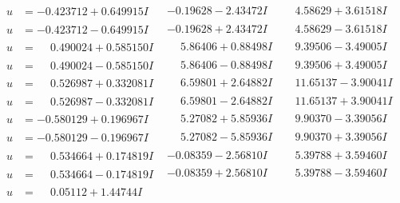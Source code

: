 \documentclass[1p]{elsarticle_modified}
\theoremstyle{definition}
\begin{document}
$$\begin{array}{c|c|c}
\begin{aligned}
u &= -0.423712 + 0.649915 I\end{aligned}
 & -0.19628 - 2.43472 I & \phantom{-}4.58629 + 3.61518 I \\ \hline\begin{aligned}
u &= -0.423712 - 0.649915 I\end{aligned}
 & -0.19628 + 2.43472 I & \phantom{-}4.58629 - 3.61518 I \\ \hline\begin{aligned}
u &= \phantom{-}0.490024 + 0.585150 I\end{aligned}
 & \phantom{-}5.86406 + 0.88498 I & \phantom{-}9.39506 - 3.49005 I \\ \hline\begin{aligned}
u &= \phantom{-}0.490024 - 0.585150 I\end{aligned}
 & \phantom{-}5.86406 - 0.88498 I & \phantom{-}9.39506 + 3.49005 I \\ \hline\begin{aligned}
u &= \phantom{-}0.526987 + 0.332081 I\end{aligned}
 & \phantom{-}6.59801 + 2.64882 I & \phantom{-}11.65137 - 3.90041 I \\ \hline\begin{aligned}
u &= \phantom{-}0.526987 - 0.332081 I\end{aligned}
 & \phantom{-}6.59801 - 2.64882 I & \phantom{-}11.65137 + 3.90041 I \\ \hline\begin{aligned}
u &= -0.580129 + 0.196967 I\end{aligned}
 & \phantom{-}5.27082 + 5.85936 I & \phantom{-}9.90370 - 3.39056 I \\ \hline\begin{aligned}
u &= -0.580129 - 0.196967 I\end{aligned}
 & \phantom{-}5.27082 - 5.85936 I & \phantom{-}9.90370 + 3.39056 I \\ \hline\begin{aligned}
u &= \phantom{-}0.534664 + 0.174819 I\end{aligned}
 & -0.08359 - 2.56810 I & \phantom{-}5.39788 + 3.59460 I \\ \hline\begin{aligned}
u &= \phantom{-}0.534664 - 0.174819 I\end{aligned}
 & -0.08359 + 2.56810 I & \phantom{-}5.39788 - 3.59460 I \\ \hline\begin{aligned}
u &= \phantom{-}0.05112 + 1.44744 I\end{aligned}

\end{array}$$
\end{document}
